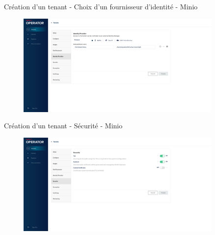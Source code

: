 \begin{frame}[fragile]{Création d'un tenant - Choix d'un fournisseur d'identité - Minio}

\begin{figure}
\begin{center}
\includegraphics[angle=0, width=0.9\textwidth, height=0.9\textheight]{images/identity_provider_minio.eps}
\end{center}
\end{figure}

\end{frame}


\begin{frame}[fragile]{Création d'un tenant - Sécurité - Minio}

\begin{figure}
\begin{center}
\includegraphics[angle=0, width=0.9\textwidth, height=0.9\textheight]{images/security_minio.eps}
\end{center}
\end{figure}

\end{frame}


